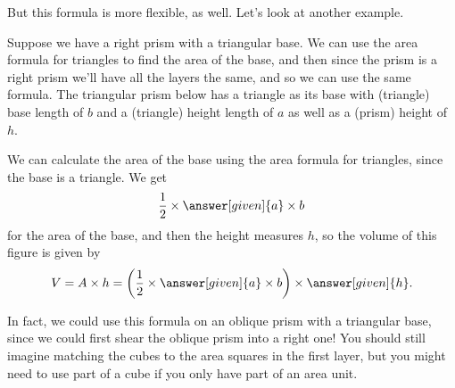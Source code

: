 \documentclass{ximera}
\begin{document}
But this formula is more flexible, as well. Let's look at another example.
\begin{example}
 Suppose we have a right prism with a triangular base. We can use the area formula for triangles to find the area of the base, and then since the prism is a right prism we'll have all the layers the same, and so we can use the same formula. The triangular prism below has a triangle as its base with (triangle) base length of $b$ and a (triangle) height length of $a$ as well as a (prism) height of $h$.
\begin{image}
\end{image}
We can calculate the area of the base using the area formula for triangles, since the base is a triangle. We get
\[
\frac12 \times \answer[given]{a} \times b
\]
for the area of the base, and then the height measures $h$, so the volume of this figure is given by
\[
V = A \times h =\left ( \frac12\times  \answer[given]{a} \times b \right ) \times \answer[given]{h}.
\]

\end{example}

In fact, we could use this formula on an oblique prism with a triangular base, since we could first shear the oblique prism into a right one! You should still imagine matching the cubes to the area squares in the first layer, but you might need to use part of a cube if you only have part of an area unit.
\end{document}
